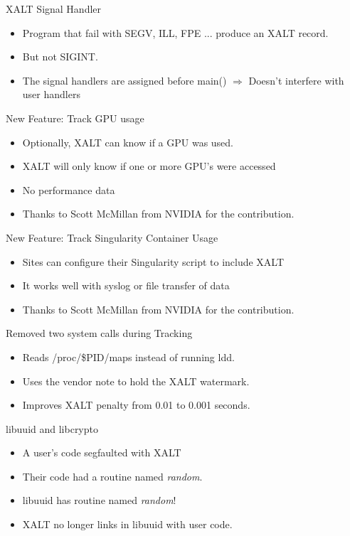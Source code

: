 \documentclass{beamer}
\begin{document}
\begin{frame}{XALT Signal Handler}
  \begin{itemize}
    \item Program that fail with SEGV, ILL, FPE ... produce an XALT record.
    \item But not SIGINT.
    \item The signal handlers are assigned before main() $\Rightarrow$
      Doesn't interfere with user handlers
  \end{itemize}
\end{frame}

\begin{frame}{New Feature: Track GPU usage}
  \begin{itemize}
    \item Optionally, XALT can know if a GPU was used.
    \item XALT will only know if one or more GPU's were accessed
    \item No performance data
    \item Thanks to Scott McMillan from NVIDIA for the contribution.
  \end{itemize}
\end{frame}

\begin{frame}{New Feature: Track Singularity Container Usage}
  \begin{itemize}
    \item Sites can configure their Singularity script to include XALT
    \item It works well with syslog or file transfer of data
    \item Thanks to Scott McMillan from NVIDIA for the contribution.
  \end{itemize}
\end{frame}

\begin{frame}{Removed two system calls during Tracking}
  \begin{itemize}
    \item Reads /proc/\$PID/maps instead of running ldd.
    \item Uses the vendor note to hold the XALT watermark.
    \item Improves XALT penalty from 0.01 to 0.001 seconds.
  \end{itemize}
\end{frame}

\begin{frame}{libuuid and libcrypto}
  \begin{itemize}
    \item A user's code segfaulted with XALT
    \item Their code had a routine named \emph{random}.
    \item libuuid has routine named \emph{random}!
    \item XALT no longer links in libuuid with user code.
  \end{itemize}
\end{frame}
\end{document}
